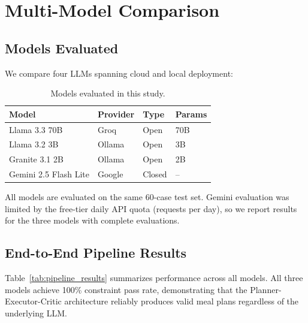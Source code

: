 \documentclass[11pt,twocolumn]{article}
\begin{document}
\section{Multi-Model Comparison}

\subsection{Models Evaluated}

We compare four LLMs spanning cloud and local deployment:

\begin{table}[H]
\centering
\caption{Models evaluated in this study.}
\label{tab:models}
\small
\begin{tabular}{@{}llll@{}}
\toprule
\textbf{Model} & \textbf{Provider} & \textbf{Type} & \textbf{Params} \\
\midrule
Llama 3.3 70B & Groq & Open & 70B \\
Llama 3.2 3B & Ollama & Open & 3B \\
Granite 3.1 2B & Ollama & Open & 2B \\
Gemini 2.5 Flash Lite & Google & Closed & -- \\
\bottomrule
\end{tabular}
\end{table}

All models are evaluated on the same 60-case test set. Gemini evaluation was limited by the free-tier daily API quota (requests per day), so we report results for the three models with complete evaluations.

\subsection{End-to-End Pipeline Results}

Table~\ref{tab:pipeline_results} summarizes performance across all models. All three models achieve 100\% constraint pass rate, demonstrating that the Planner-Executor-Critic architecture reliably produces valid meal plans regardless of the underlying LLM.
\end{document}
